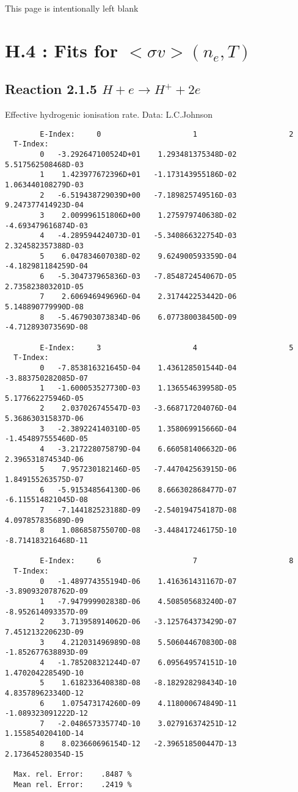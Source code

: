\newpage
This page is intentionally left blank
\newpage


\section{H.4 :  Fits for $<\sigma v> (n_e,T)$}

\subsection{
Reaction 2.1.5   $H + e \rightarrow H^+ + 2e $}

   Effective hydrogenic ionisation rate. Data: L.C.Johnson

\begin{verbatim}
        E-Index:     0                     1                     2
  T-Index:
        0   -3.292647100524D+01    1.293481375348D-02    5.517562508468D-03
        1    1.423977672396D+01   -1.173143955186D-02    1.063440108279D-03
        2   -6.519438729039D+00   -7.189825749516D-03    9.247377414923D-04
        3    2.009996151806D+00    1.275979740638D-02   -4.693479616874D-03
        4   -4.289594424073D-01   -5.340866322754D-03    2.324582357388D-03
        5    6.047834607038D-02    9.624900593359D-04   -4.182981184259D-04
        6   -5.304737965836D-03   -7.854872454067D-05    2.735823803201D-05
        7    2.606946949696D-04    2.317442253442D-06    5.148890779990D-08
        8   -5.467903073834D-06    6.077380038450D-09   -4.712893073569D-08

        E-Index:     3                     4                     5
  T-Index:
        0   -7.853816321645D-04    1.436128501544D-04   -3.883750282085D-07
        1   -1.600053527730D-03    1.136554639958D-05    5.177662275946D-05
        2    2.037026745547D-03   -3.668717204076D-04    5.368630315837D-06
        3   -2.389224140310D-05    1.358069915666D-04   -1.454897555460D-05
        4   -3.217228075879D-04    6.660581406632D-06    2.396531874534D-06
        5    7.957230182146D-05   -7.447042563915D-06    1.849155263575D-07
        6   -5.915348564130D-06    8.666302868477D-07   -6.115514821045D-08
        7   -7.144182523188D-09   -2.540194754187D-08    4.097857835689D-09
        8    1.086858755070D-08   -3.448417246175D-10   -8.714183216468D-11

        E-Index:     6                     7                     8
  T-Index:
        0   -1.489774355194D-06    1.416361431167D-07   -3.890932078762D-09
        1   -7.947999902838D-06    4.508505683240D-07   -8.952614093357D-09
        2    3.713958914062D-06   -3.125764373429D-07    7.451213220623D-09
        3    4.212031496989D-08    5.506044670830D-08   -1.852677638893D-09
        4   -1.785208321244D-07    6.095649574151D-10    1.470204228549D-10
        5    1.618233640838D-08   -8.182928298434D-10    4.835789623340D-12
        6    1.075473174260D-09    4.118000674849D-11   -1.089323091222D-12
        7   -2.048657335774D-10    3.027916374251D-12    1.155854020410D-14
        8    8.023660696154D-12   -2.396518500447D-13    2.173645280354D-15

  Max. rel. Error:    .8487 %
  Mean rel. Error:    .2419 %
\end{verbatim}
